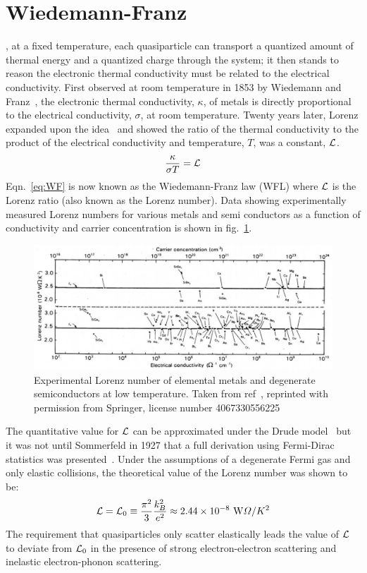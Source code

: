 \section{Wiedemann-Franz}
, at a fixed temperature, each quasiparticle can transport a quantized amount of thermal energy and a quantized charge through the system; it then stands to reason the electronic thermal conductivity must be related to the electrical conductivity. First observed at room temperature in 1853 by Wiedemann and Franz~\cite{franz_ueber_1853},  the electronic thermal conductivity, $\kappa$, of metals is directly proportional to the electrical conductivity, $\sigma$, at room temperature. Twenty years later, Lorenz expanded upon the idea~\cite{lorenz_bestimmung_1872} and showed the ratio of the thermal conductivity to the product of the electrical conductivity and temperature, $T$, was a constant, $\mathcal{L}$.
\begin{equation}\label{eq:WF}
\frac{\kappa}{\sigma T} = \mathcal{L}
\end{equation}
Eqn.~\ref{eq:WF} is now known as the Wiedemann-Franz law (WFL) where $\mathcal{L}$ is the Lorenz ratio (also known as the Lorenz number). Data showing experimentally measured Lorenz numbers for various metals and semi conductors as a function of conductivity and carrier concentration is shown in fig.~\ref{fig:WF_in_metals}.
\begin{figure}
\centering
\includegraphics[width=\textwidth]{figures/electronic_cooling/WF_in_metals.png}
\caption{Experimental Lorenz number of elemental metals and degenerate semiconductors at low temperature. Taken from ref~\cite{kumar_experimental_1993}, reprinted with permission from Springer, license number 4067330556225}
\label{fig:WF_in_metals}
\end{figure}
The quantitative value for $\mathcal{L}$ can be approximated under the Drude model~\cite{ashcroft_solid_1976} but it was not until Sommerfeld in 1927 that a full derivation using Fermi-Dirac statistics was presented~\cite{sommerfeld_zur_1927}. Under the assumptions of a degenerate Fermi gas and only elastic collisions, the theoretical value of the Lorenz number was shown to be:
\begin{equation}
\mathcal{L} = \mathcal{L}_0 \equiv \frac{\pi^2}{3}\frac{k_B^2}{e^2} \approx 2.44\times10^{-8}~\mathrm{W}\Omega/K^2
\end{equation}
The requirement that quasiparticles only scatter elastically leads the value of $\mathcal{L}$ to deviate from $\mathcal{L}_0$ in the presence of strong electron-electron scattering and inelastic electron-phonon scattering.


